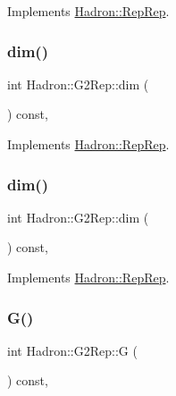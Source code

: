 Implements \mbox{\hyperlink{structHadron_1_1RepRep_a92c8802e5ed7afd7da43ccfd5b7cd92b}{Hadron\+::\+Rep\+Rep}}.

\mbox{\label{structHadron_1_1G2Rep_a7c8d894ff5da6fead1964484c04a4c80}} 
\subsubsection{\texorpdfstring{dim()}{dim()}\hspace{0.1cm}{\footnotesize\ttfamily [4/5]}}
{\footnotesize\ttfamily int Hadron\+::\+G2\+Rep\+::dim (\begin{DoxyParamCaption}{ }\end{DoxyParamCaption}) const\hspace{0.3cm}{\ttfamily [inline]}, {\ttfamily [virtual]}}



Implements \mbox{\hyperlink{structHadron_1_1RepRep_a92c8802e5ed7afd7da43ccfd5b7cd92b}{Hadron\+::\+Rep\+Rep}}.

\mbox{\label{structHadron_1_1G2Rep_a7c8d894ff5da6fead1964484c04a4c80}} 
\subsubsection{\texorpdfstring{dim()}{dim()}\hspace{0.1cm}{\footnotesize\ttfamily [5/5]}}
{\footnotesize\ttfamily int Hadron\+::\+G2\+Rep\+::dim (\begin{DoxyParamCaption}{ }\end{DoxyParamCaption}) const\hspace{0.3cm}{\ttfamily [inline]}, {\ttfamily [virtual]}}



Implements \mbox{\hyperlink{structHadron_1_1RepRep_a92c8802e5ed7afd7da43ccfd5b7cd92b}{Hadron\+::\+Rep\+Rep}}.

\mbox{\label{structHadron_1_1G2Rep_ad27dff08ddb0fa10f2dc503f47cdd766}} 
\subsubsection{\texorpdfstring{G()}{G()}\hspace{0.1cm}{\footnotesize\ttfamily [1/3]}}
{\footnotesize\ttfamily int Hadron\+::\+G2\+Rep\+::G (\begin{DoxyParamCaption}{ }\end{DoxyParamCaption}) const\hspace{0.3cm}{\ttfamily [inline]}, {\ttfamily [virtual]}}

